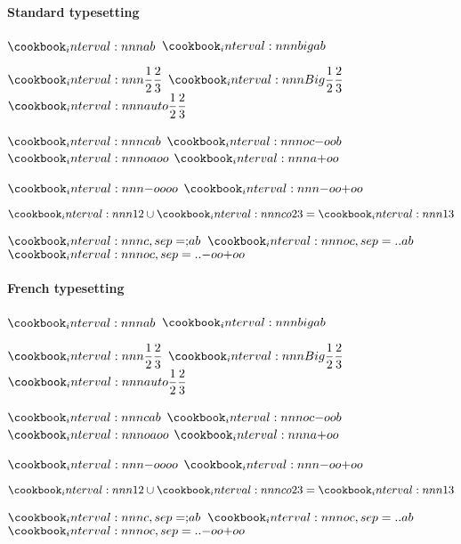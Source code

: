 \documentclass[varwidth, border = 3pt]{standalone}
\newcommand\example{
    $\interval{a, b}$
    \quad
    $\interval[big]{a, b}$

    $\interval{\dfrac{1}{2}, \dfrac{2}{3}}$
    \quad
    $\interval[Big]{\dfrac{1}{2}, \dfrac{2}{3}}$
    \quad
    $\interval[auto]{\dfrac{1}{2}, \dfrac{2}{3}}$

    $\interval[c]{a, b}$
    \quad
    $\interval[oc]{-oo, b}$
    \quad
    $\interval[o]{a, oo}$
    \quad
    $\interval{a, +oo}$

    $\interval{-oo, oo}$
    \quad
    $\interval{-oo, +oo}$

    $\interval{1, 2} \cup \interval[co]{2, 3} = \interval{1, 3}$

    $\interval[c, sep=;]{a, b}$
    \quad
    $\interval[oc, sep=..]{a, b}$
    \quad
    $\interval[oc, sep=..]{-oo, +oo}$
}
\begin{document}
\begin{multicols}{2}
    \paragraph{Standard typesetting}
    \leavevmode

    \example

    \paragraph{French typesetting}
    \leavevmode

    \example
\end{multicols}
\end{document}
